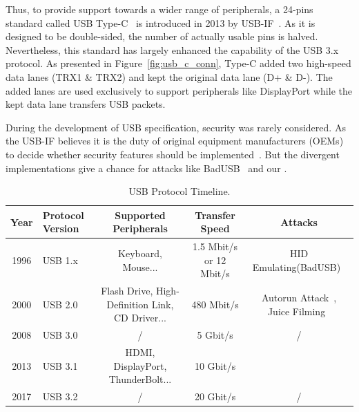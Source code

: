 Thus, to provide support towards a wider range of peripherals, a 24-pins
standard called USB Type-C~\cite{typec} is introduced in 2013 by USB-IF~\cite{usbif}. As it is designed to be double-sided, the number of actually usable
pins is halved. Nevertheless, this standard has largely enhanced the capability
of the USB 3.x protocol. As presented in Figure~\ref{fig:usb_c_conn}, Type-C added
two high-speed data lanes (TRX1 \& TRX2) and kept the original data lane (D+ \&
D-). The added lanes are used exclusively to support peripherals like
DisplayPort while the kept data lane transfers USB packets.

During the development of USB specification, security was rarely considered. As
the USB-IF believes it is the duty of original equipment manufacturers (OEMs)
to decide whether security features should be implemented~\cite{usbsec}. But the divergent implementations give a chance for attacks like
BadUSB~\cite{rubber} and our \tool.

\begin{table}
\begin{tabular}{clccc}
	\hline
	\textbf{Year} & \textbf{Protocol Version} & \textbf{Supported Peripherals} & \textbf{Transfer Speed} & \textbf{Attacks} \\
	\hline
	1996 & USB 1.x~\cite{usb10,usb11} & Keyboard, Mouse... & 1.5 Mbit/s or 12 Mbit/s & HID Emulating(BadUSB)~\cite{badusb} \\
	2000 & USB 2.0~\cite{usb20} & Flash Drive, High-Definition Link, CD Driver... & 480 Mbit/s & Autorun Attack~\cite{duqu}, Juice Filming~\cite{JFC,JFCImpact} \\
	2008 & USB 3.0~\cite{usb30} & / & 5 Gbit/s & / \\
	2013 & USB 3.1~\cite{usb31} & HDMI, DisplayPort, ThunderBolt... & 10 Gbit/s & \tool \\
	2017 & USB 3.2~\cite{usb32} & / & 20 Gbit/s & / \\
	\hline
\end{tabular}
	\linebreak
\caption{USB Protocol Timeline.}
\label{table:usb_timeline}
\end{table}
